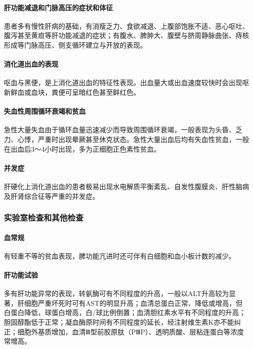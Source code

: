 \paragraph{肝功能减退和门脉高压的症状和体征}

患者多有慢性肝病的基础，有消瘦乏力、食欲减退、上腹部饱胀不适、恶心呕吐、腹泻甚至黄疸等肝功能减退的症状；有腹水、脾肿大、腹壁与脐周静脉曲张、痔核形成等门脉高压、侧支循环建立与开放的表现。

\paragraph{消化道出血的表现}

呕血与黑便，是上消化道出血的特征性表现。出血量大或出血速度较快时会出现呕新鲜血或血块，粪便可呈暗红色甚至鲜红色。

\paragraph{失血性周围循环衰竭和贫血}

急性大量失血由于循环血量迅速减少而导致周围循环衰竭，一般表现为头昏、乏力、心悸，严重时出现晕厥甚至休克状态。急性大量出血后均有失血性贫血，一般在出血后3～4小时出现，多为正细胞正色素性贫血。

\paragraph{并发症}

肝硬化上消化道出血的患者极易出现水电解质平衡紊乱、自发性腹膜炎、肝性脑病及肝肾综合征等严重的并发症。

\subsubsection{实验室检查和其他检查}

\paragraph{血常规}

有轻重不等的贫血表现，脾功能亢进时还可伴有白细胞和血小板计数的减少。

\paragraph{肝功能试验}

多有肝功能异常的表现，转氨酶可有不同程度的升高，一般以ALT升高较为显著，肝细胞严重坏死时可有AST的明显升高；血清总蛋白正常、降低或增高，但白蛋白降低，球蛋白增高，白/球比例倒置；血清胆红素水平有不同程度的升高；胆固醇酯低于正常；凝血酶原时间有不同程度的延长，经注射维生素K亦不能纠正；细胞外基质增加，血清Ⅲ型前胶原肽（PⅢP）、透明质酸、层粘连蛋白等浓度常增高。

